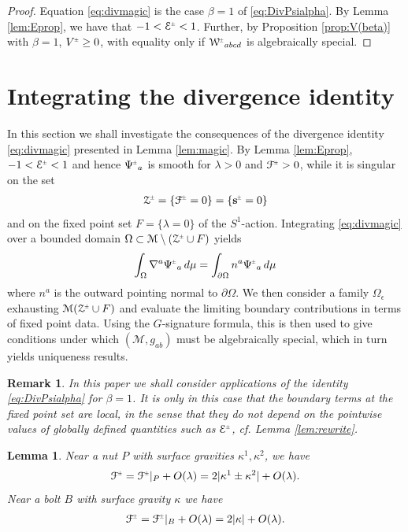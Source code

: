 \documentclass[a4paper,11pt,reqno]{amsart}
\newcommand{\nut}{P}
\newcommand{\bolt}{B}
\newcommand{\cE}{\mathcal{E}}
\newcommand{\cZ}{\mathcal{Z}}
\newcommand{\cM}{\mathcal{M}}
\theoremstyle{plain}
\newtheorem{lemma}[thm]{Lemma}
\newtheorem{remark}[thm]{Remark}
\newcommand{\PM}[1]{{{#1}^{\hspace{-.5pt}\scaleto{\pm}{3.5pt}}}}
\def\Wcal{\mathcal{W}}
\def\Fcal{\mathcal{F}}
\def\sbold{\mathbf{s}}
\numberwithin{equation}{section}
\newcommand{\eps}{\epsilon}
\newcommand{\Fixed}{F}
\begin{document}
\begin{proof} 
Equation \eqref{eq:divmagic} is the case $\beta=1$ of 
\eqref{eq:DivPsialpha}. By Lemma \ref{lem:Eprop}, we have that $-1 < \PM{\cE} < 1$. Further, by Proposition \ref{prop:V(beta)} with $\beta=1$, $\PM{V} \geq 0$, with equality only if $\PM{\Wcal}_{abcd}$ is algebraically special. 
\end{proof} 
 



\section{Integrating the divergence identity} 
\label{sec:int}

In this section we shall investigate the consequences of the divergence identity \eqref{eq:divmagic} presented in Lemma \ref{lem:magic}. 
%
%
%
%
%
%
%
By Lemma \ref{lem:Eprop}, $-1 < \PM{\cE} < 1$ and hence 
$\PM{\Psi}_a$ is smooth for $\lambda > 0$ and $\PM{\Fcal} > 0$, while it is singular on the set
\begin{align} \label{eq:cZdef}
\PM{\cZ} = \{\PM{\Fcal} = 0\} = \{\PM{\sbold} = 0\}
\end{align}
and on the fixed point set $\Fixed = \{\lambda = 0\}$ of the $S^1$-action. Integrating \eqref{eq:divmagic} over a bounded domain  $\Omega \subset \cM \setminus (\PM{\cZ} \cup \Fixed)$ 
yields 
\begin{align} \label{eq:magic-boundary} 
\int_\Omega \nabla^a \PM{\Psi}_a \, d\mu
= \int_{\partial \Omega} n^a \PM{\Psi}_a \, d\mu
\end{align} 
where $n^a$ is the outward pointing normal to $\partial \Omega$. We then consider a family $\Omega_\eps$ exhausting $\cM (\PM{\cZ} \cup \Fixed)$ and evaluate the limiting boundary contributions in terms of fixed point data. Using the $G$-signature formula, this is then used to give conditions under which  $(\cM, g_{ab})$ must be algebraically special, which in turn yields uniqueness results. 
%


\begin{remark} \label{rem:beta}
In this paper we shall consider applications of the identity \eqref{eq:DivPsialpha} for $\beta=1$. It is only in this case that the boundary terms at the fixed point set are local, in the sense that they do not depend on the pointwise values of globally defined quantities such as $\PM{\cE}$, cf. Lemma \ref{lem:rewrite}. 
%
\end{remark} 


\begin{lemma} 
\label{lem:Fcalprop} 
Near a nut $\nut$ with surface gravities $\kappa^1, \kappa^2$, we have
\begin{align}
\PM{\Fcal} 
= \PM{\Fcal}|_\nut + O(\lambda)
= 2|\kappa^1 \pm \kappa^2| + O(\lambda).
\end{align}
Near a bolt $\bolt$ with surface gravity $\kappa$ we have 
\begin{align}
\PM{\Fcal} 
= \PM{\Fcal}|_\bolt + O(\lambda)
= 2|\kappa| + O(\lambda).
\end{align}
\end{lemma} 
\end{document}
